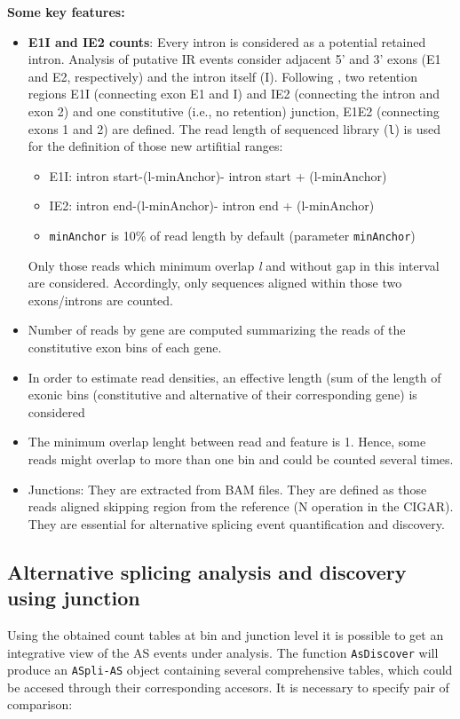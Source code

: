 \documentclass{article}
\begin{document}
\textbf{Some key features:}
\begin{itemize}
\item \textbf{E1I and IE2 counts}: Every intron is considered as a potential retained intron. Analysis of putative IR events consider  adjacent 5' and 3' exons (E1 and E2, respectively) and the intron itself (I). Following \cite{pmid25258385}, two retention regions E1I (connecting exon E1 and I) and IE2 (connecting the intron and exon 2) and one constitutive (i.e., no retention) junction, E1E2 (connecting exons 1 and 2) are defined. The read length of sequenced library (\texttt{l}) is used for the definition of those new artifitial ranges:
\begin{itemize}
  \item E1I: intron start-(l-minAnchor)- intron start + (l-minAnchor)
  \item IE2: intron end-(l-minAnchor)- intron end + (l-minAnchor)
  \item \texttt{minAnchor} is 10\% of read length by default (parameter \texttt{minAnchor})
\end{itemize}
Only those reads which minimum overlap \textit{l} and without gap in this interval are considered. Accordingly, only sequences aligned within those two exons/introns are counted. 
\item Number of reads by gene are computed summarizing the reads of the constitutive exon bins of each gene. 
\item In order to estimate read densities, an effective length (sum of the length of exonic bins (constitutive and alternative of their corresponding gene) is considered
\item The minimum overlap lenght between read and feature is 1. Hence, some reads might overlap to more than one bin  and could be counted several times.
\item Junctions: They are extracted from BAM files. They are defined as those reads aligned skipping region from the reference (N operation in the CIGAR). They are essential for alternative splicing event quantification and discovery. 
\end{itemize}

\subsection{Alternative splicing analysis and discovery using junction}
Using the obtained count tables at bin and junction level it is possible to get an integrative view of the AS events under analysis. The function \texttt{AsDiscover} will produce an \texttt{ASpli-AS} object containing several comprehensive tables, which could be accesed through their corresponding accesors. It is necessary to specify pair of comparison:
\end{document}
